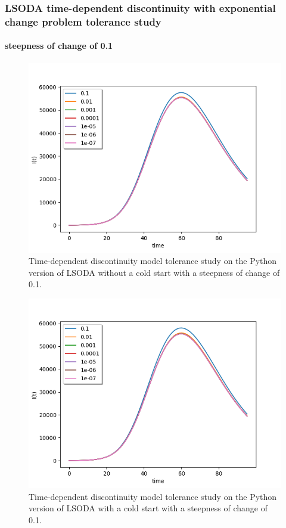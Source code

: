 \subsubsection{LSODA time-dependent discontinuity with exponential change problem tolerance study}
\paragraph{steepness of change of 0.1}

\begin{figure}[H]
\centering
\includegraphics[width=0.7\linewidth]{./figures/exp_time_tol_lsoda_no_event_0_1}
\caption{Time-dependent discontinuity model tolerance study on the Python version of LSODA without a cold start with a steepness of change of 0.1.}
\label{fig:exp_time_tol_lsoda_no_event_0_1}
\end{figure}

\begin{figure}[H]
\centering
\includegraphics[width=0.7\linewidth]{./figures/exp_time_tol_lsoda_event_0_1}
\caption{Time-dependent discontinuity model tolerance study on the Python version of LSODA with a cold start with a steepness of change of 0.1.}
\label{fig:exp_time_tol_lsoda_event_0_1}
\end{figure}

